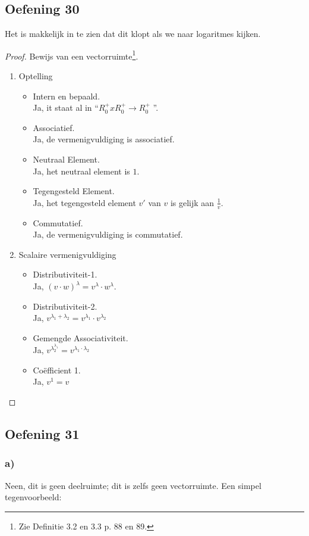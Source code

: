 \documentclass[lineaire_algebra_oplossingen.tex]{subfiles}
\begin{document}
\subsection{Oefening 30}
Het is makkelijk in te zien dat dit klopt als we naar logaritmes kijken.
\begin{proof}
Bewijs van een vectorruimte\footnote{Zie Definitie 3.2 en 3.3 p. 88 en 89.}.
\begin{enumerate}
\item
Optelling
\begin{itemize}
\item Intern en bepaald.\\
Ja, it staat al in ``$R_{0}^{+} x R_{0}^{+} \rightarrow R_{0}^{+}$ ''.
\item Associatief.\\
Ja, de vermenigvuldiging is associatief.
\item Neutraal Element.\\
Ja, het neutraal element is $1$.
\item Tegengesteld Element.\\
Ja, het tegengesteld element $v'$ van $v$ is gelijk aan $\frac{1}{v}$.
\item Commutatief.\\
Ja, de vermenigvuldiging is commutatief.
\end{itemize}
\item
Scalaire vermenigvuldiging
\begin{itemize}
\item Distributiviteit-1.\\
Ja, $(v\cdot w)^\lambda = v^\lambda \cdot w^\lambda$.
\item Distributiviteit-2.\\
Ja, $v^{\lambda_1 + \lambda_2} = v^{\lambda_1}\cdot v^{\lambda_2}$
\item Gemengde Associativiteit.\\
Ja, $v^{\lambda_2^{\lambda_1}} = v^{\lambda_1 \cdot \lambda_2}$
\item Co\"efficient 1.\\
Ja, $v^{1} = v$
\end{itemize}
\end{enumerate}
\end{proof}


\subsection{Oefening 31}
\subsubsection*{a)}
Neen, dit is geen deelruimte; dit is zelfs geen vectorruimte. Een simpel tegenvoorbeeld:\\
\end{document}
